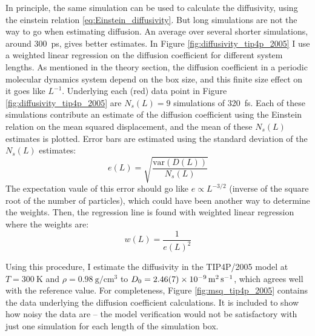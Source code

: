 In principle, the same simulation can be used to calculate the diffusivity, using the einstein relation \ref{eq:Einstein_diffusivity}. But long simulations are not the way to go when estimating diffusion. An average over several shorter simulations, around \SI{300}{\pico\second}, gives better estimates. 
In Figure \ref{fig:diffusivity_tip4p_2005} I use a weighted linear regression on the diffusion coefficient for different system lengths. As mentioned in the theory section, the diffusion coefficient in a periodic molecular dynamics system depend on the box size, and this finite size effect on it goes like $L^{-1}$. Underlying each (red) data point in Figure \ref{fig:diffusivity_tip4p_2005} are $N_s(L)=9$ simulations of \SI{320}{\femto\second}. Each of these simulations contribute an estimate of the diffusion coefficient using the Einstein relation on the mean squared displacement, and the mean of these $N_s(L)$ estimates is plotted. Error bars are estimated using the standard deviation of the $N_s(L)$ estimates: 
\begin{equation}
	e(L) = \sqrt{\frac{\text{var}(D(L))}{N_s(L)}}
\end{equation}
The expectation vaule of this error should go like $e \propto L^{-3/2}$ (inverse of the square root of the number of particles), which could have been another way to determine the weights.
Then, the regression line is found with weighted linear regression where the weights are:
\begin{equation}
	w(L) = \frac{1}{e(L)^2}
\end{equation}

Using this procedure, I estimate the diffusivity in the TIP4P/2005 model at $T=\SI{300}{\kelvin}$ and $\rho = \SI{0.98}{\gram\per\centi\meter\cubed}$ to $D_0=\text{\SI{2.46\pm0.07d-9}{\meter\squared\per\second}}$, which agrees well with the reference value. For completeness, Figure \ref{fig:msq_tip4p_2005} contains the data underlying the diffusion coefficient calculations. It is included to show how noisy the data are -- the model verification would not be satisfactory with just one simulation for each length of the simulation box.

